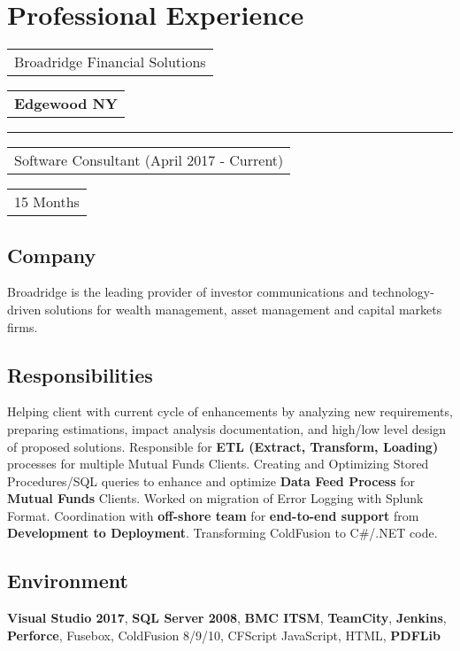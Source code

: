 \documentclass[letterpaper,10pt]{article}
\begin{document}
    \newpage
    \section{Professional Experience}


    \noindent
    \begin{tabular}[t]{@{}l}
    \Large{Broadridge Financial Solutions}
    \end{tabular}
    \hfill
    \begin{tabular}[t]{l@{}}
    \textbf{Edgewood NY}
    \end{tabular}
    \noindent\rule{\textwidth}{0.5pt}
    \begin{tabular}[t]{@{}l}
    Software Consultant (April 2017 - Current)
    \end{tabular}
    \hfill
    \begin{tabular}[t]{l@{}}
    15 Months
    \end{tabular}

    \subsection{Company}
    Broadridge is the leading provider of investor communications and technology-driven solutions for wealth management, asset management and capital markets firms.

    \subsection{Responsibilities}
    Helping client with current cycle of enhancements by analyzing new requirements, preparing estimations, impact analysis documentation, and high/low level design of proposed solutions. Responsible for \textbf{ETL (Extract, Transform, Loading)} processes for multiple Mutual Funds Clients. Creating and Optimizing Stored Procedures/SQL queries to enhance and optimize \textbf{Data Feed Process} for \textbf{Mutual Funds} Clients. Worked on migration of Error Logging with Splunk Format. Coordination with \textbf{off-shore team} for \textbf{end-to-end support} from \textbf{Development to Deployment}. Transforming ColdFusion to C\#/.NET code.

    \subsection{Environment}
    \textbf{Visual Studio 2017}, \textbf{SQL Server 2008}, \textbf{BMC ITSM}, \textbf{TeamCity}, \textbf{Jenkins}, \textbf{Perforce}, Fusebox,  ColdFusion 8/9/10, CFScript JavaScript, HTML, \textbf{PDFLib}
\end{document}
